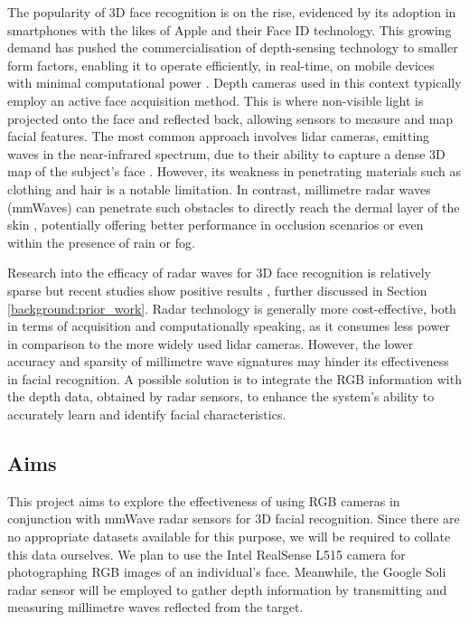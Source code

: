 \documentclass{interim}
\begin{document}
The popularity of 3D face recognition is on the rise, evidenced by its adoption in smartphones with the likes of Apple and their Face ID \cite{apple-faceid} technology. This growing demand has pushed the commercialisation of depth-sensing technology to smaller form factors, enabling it to operate efficiently, in real-time, on mobile devices with minimal computational power \cite{soumya2023recent}. Depth cameras used in this context typically employ an active face acquisition method. This is where non-visible light is projected onto the face and reflected back, allowing sensors to measure and map facial features. The most common approach involves lidar cameras, emitting waves in the near-infrared spectrum, due to their ability to capture a dense 3D map of the subject's face \cite{wang2020evolution}. However, its weakness in penetrating materials such as clothing and hair is a notable limitation. In contrast, millimetre radar waves (mmWaves) can penetrate such obstacles to directly reach the dermal layer of the skin \cite{vizard2006advances}, potentially offering better performance in occlusion scenarios or even within the presence of rain or fog.

Research into the efficacy of radar waves for 3D face recognition is relatively sparse but recent studies show positive results \cite{hof2020face, lim2020dnn,kim2020face, pho2021radar,challa2021face}, further discussed in Section \ref{background:prior_work}. Radar technology is generally more cost-effective, both in terms of acquisition and computationally speaking, as it consumes less power in comparison to the more widely used lidar cameras. However, the lower accuracy and sparsity of millimetre wave signatures may hinder its effectiveness in facial recognition. A possible solution is to integrate the RGB information with the depth data, obtained by radar sensors, to enhance the system's ability to accurately learn and identify facial characteristics.


\subsection{Aims}
This project aims to explore the effectiveness of using RGB cameras in conjunction with mmWave radar sensors for 3D facial recognition. Since there are no appropriate datasets available for this purpose, we will be required to collate this data ourselves. We plan to use the Intel RealSense L515 camera \cite{intel-l515} for photographing RGB images of an individual's face. Meanwhile, the Google Soli radar sensor \cite{lien2016soli} will be employed to gather depth information by transmitting and measuring millimetre waves reflected from the target.
\end{document}
